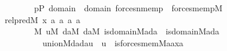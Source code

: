 \begin{isabellebody}
\ \ \ \ \ \ \ \ {\isachardoublequoteopen}{\isacharbraceleft}{\kern0pt}p{\isasymin}P{\isachardot}{\kern0pt}\ {\isasymexists}{\isasymsigma}{\isasymin}domain{\isacharparenleft}{\kern0pt}{\isasymtau}{\isacharparenright}{\kern0pt}\ {\isasymunion}\ domain{\isacharparenleft}{\kern0pt}{\isasymtheta}{\isacharparenright}{\kern0pt}{\isachardot}{\kern0pt}\ forces{\isacharunderscore}{\kern0pt}nmem{\isacharparenleft}{\kern0pt}p{\isacharcomma}{\kern0pt}{\isasymsigma}{\isacharcomma}{\kern0pt}{\isasymtau}{\isacharparenright}{\kern0pt}\ {\isasymand}\ forces{\isacharunderscore}{\kern0pt}mem{\isacharparenleft}{\kern0pt}p{\isacharcomma}{\kern0pt}{\isasymsigma}{\isacharcomma}{\kern0pt}{\isasymtheta}{\isacharparenright}{\kern0pt}{\isacharbraceright}{\kern0pt}{\isasymin}M{\isachardoublequoteclose}\isanewline
%
\isadelimproof
%
\endisadelimproof
%
\isatagproof
{}\isamarkupfalse%
\ {\isacharminus}{\kern0pt}\isanewline
\ \ \isamarkupfalse%
\ {\isacharquery}{\kern0pt}rel{\isacharunderscore}{\kern0pt}pred{\isacharequal}{\kern0pt}{\isachardoublequoteopen}{\isasymlambda}M\ x\ a{}\ a{}\ a{}\ a{}{\isachardot}{\kern0pt}\ \isanewline
\ \ \ \ \ \ \ \ {\isasymexists}{\isasymsigma}{\isacharbrackleft}{\kern0pt}M{\isacharbrackright}{\kern0pt}{\isachardot}{\kern0pt}\ {\isasymexists}u{\isacharbrackleft}{\kern0pt}M{\isacharbrackright}{\kern0pt}{\isachardot}{\kern0pt}\ {\isasymexists}da{}{\isacharbrackleft}{\kern0pt}M{\isacharbrackright}{\kern0pt}{\isachardot}{\kern0pt}\ {\isasymexists}da{}{\isacharbrackleft}{\kern0pt}M{\isacharbrackright}{\kern0pt}{\isachardot}{\kern0pt}\ is{\isacharunderscore}{\kern0pt}domain{\isacharparenleft}{\kern0pt}M{\isacharcomma}{\kern0pt}a{}{\isacharcomma}{\kern0pt}da{}{\isacharparenright}{\kern0pt}\ {\isasymand}\ is{\isacharunderscore}{\kern0pt}domain{\isacharparenleft}{\kern0pt}M{\isacharcomma}{\kern0pt}a{}{\isacharcomma}{\kern0pt}da{}{\isacharparenright}{\kern0pt}\ {\isasymand}\ \isanewline
\ \ \ \ \ \ \ \ \ \ union{\isacharparenleft}{\kern0pt}M{\isacharcomma}{\kern0pt}da{}{\isacharcomma}{\kern0pt}da{}{\isacharcomma}{\kern0pt}u{\isacharparenright}{\kern0pt}\ {\isasymand}\ {\isasymsigma}{\isasymin}u\ {\isasymand}\ is{\isacharunderscore}{\kern0pt}forces{\isacharunderscore}{\kern0pt}mem{\isacharprime}{\kern0pt}{\isacharparenleft}{\kern0pt}M{\isacharcomma}{\kern0pt}a{}{\isacharcomma}{\kern0pt}a{}{\isacharcomma}{\kern0pt}x{\isacharcomma}{\kern0pt}{\isasymsigma}{\isacharcomma}{\kern0pt}a{}{\isacharparenright}{\kern0pt}\ {\isasymand}\ \isanewline

\end{isabellebody}
